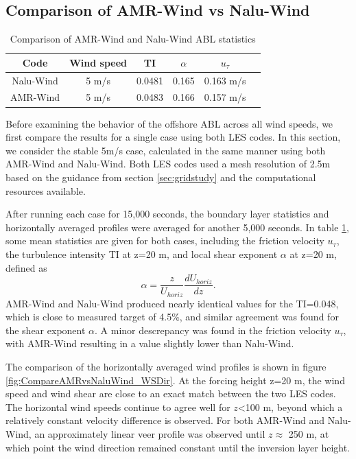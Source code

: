 \subsection{Comparison of AMR-Wind vs Nalu-Wind}

\begin{table}
\caption{\label{tab:CompareAMRvsNalu} Comparison of AMR-Wind and
  Nalu-Wind ABL statistics} \centering
\begin{tabular}{cccccc}
  \hline
  Code & Wind speed & TI      &  $\alpha$  &   $u_\tau$ \\ %
  \hline
  Nalu-Wind & 5 m/s &  0.0481 &  0.165     &  0.163 m/s \\ %
  AMR-Wind  & 5 m/s &  0.0483 &  0.166     &  0.157 m/s \\ %
  \hline
\end{tabular}
\end{table}

Before examining the behavior of the offshore ABL across all wind speeds,
we first compare the results for a single case using both LES codes.
In this section, we consider the stable 5m/s case, calculated in the
same manner using both AMR-Wind and Nalu-Wind.  Both LES codes used a
mesh resolution of 2.5m based on the guidance from section
\ref{sec:gridstudy} and the computational resources available.

After running each case for 15,000 seconds, the boundary layer
statistics and horizontally averaged profiles were averaged for
another 5,000 seconds.  In table \ref{tab:CompareAMRvsNalu}, some mean
statistics are given for both cases, including the friction velocity
$u_\tau$, the turbulence intensity TI at z=20 m, and local shear
exponent $\alpha$ at z=20 m, defined as
$$ \alpha = \frac{z}{U_{horiz}} \frac{d U_{horiz}}{dz}.
$$ AMR-Wind and Nalu-Wind produced nearly identical values for the
TI=0.048, which is close to measured target of 4.5\%, and similar
agreement was found for the shear exponent $\alpha$.  A minor
descrepancy was found in the friction velocity $u_\tau$, with AMR-Wind
resulting in a value slightly lower than Nalu-Wind.

The comparison of the horizontally averaged wind profiles is shown in
figure \ref{fig:CompareAMRvsNaluWind_WSDir}.  At the forcing height
z=20 m, the wind speed and wind shear are close to an exact match
between the two LES codes.  The horizontal wind speeds continue to
agree well for $z$<100 m, beyond which a relatively constant velocity
difference is observed.   For both AMR-Wind and Nalu-Wind, an
approximately linear veer profile was observed until $z\approx$ 250 m,
at which point the wind direction remained constant until the
inversion layer height.

